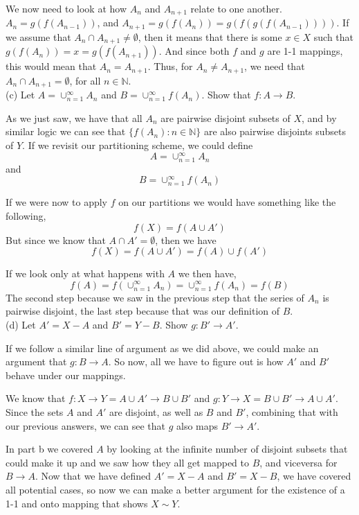 We now need to look at how $A_n$ and $A_{n+1}$ relate to one another.
$A_n = g(f(A_{n-1}))$, and $A_{n+1} = g(f(A_n)) = g(f(g(f(A_{n-1}))))$.
If we assume that $A_n \cap A_{n+1} \neq \emptyset$, then it means that there is
some $x\in X$ such that $g(f(A_n)) = x = g(f(A_{n+1}))$.
And since both $f$ and $g$ are 1-1 mappings, this would mean that $A_n = A_{n+1}$.
Thus, for $A_n \neq A_{n+1}$, we need that $A_n \cap A_{n+1} = \emptyset$, for all $n\in\mathbb{N}$.
\\



(c) Let $A =  \cup^{\infty}_{n=1} A_n$ and $B =  \cup^{\infty}_{n=1} f(A_n)$.
Show that $f: A \rightarrow B$.

As we just saw, we have that all $A_n$ are pairwise disjoint subsets of $X$, and by similar logic we can see that
$\{ f(A_n) : n\in\mathbb{N} \}$ are also pairwise disjoints subsets of $Y$.
If we revisit our partitioning scheme, we could define
$$
A = \cup^{\infty}_{n=1} A_n
$$
and
$$
B = \cup^{\infty}_{n=1} f(A_n)
$$

If we were now to apply $f$ on our partitions we would have something like the following,
$$
f(X) = f\left(
    A \cup A'
\right)
$$
But since we know that $A \cap A' = \emptyset$, then we have
$$
f(X) = f\left(   A \cup A' \right) =
    f(A) \cup f(A')
$$

If we look only at what happens with $A$ we then have,
$$
f(A) = f\left( \cup^{\infty}_{n=1} A_n \right) =
    \cup^{\infty}_{n=1} f(A_n) =
    f(B)
$$
The second step because we saw in the previous step that the series of $A_n$ is pairwise disjoint, the last step because
that was our definition of $B$.
\\

(d) Let $A' = X-A$ and $B' = Y-B$. Show $g: B' \rightarrow A'$.

If we follow a similar line of argument as we did above, we could make an argument that
$g: B\rightarrow A$.
So now, all we have to figure out is how $A'$ and $B'$ behave under our mappings.

We know that $f: X\rightarrow Y = A\cup A' \rightarrow B\cup B'$
and $g: Y \rightarrow X = B\cup B' \rightarrow A\cup A'$.
Since the sets $A$ and $A'$ are disjoint, as well as $B$ and $B'$, combining that with our previous answers,
we can see that $g$ also maps $B' \rightarrow A'$.

In part b we covered $A$ by looking at the infinite number of disjoint subsets that could make it up and we saw how
they all get mapped to $B$, and viceversa for $B \rightarrow A$.
Now that we have defined $A' = X-A$ and $B' = X-B$, we have covered all potential cases, so now we can
make a better argument for the existence of a 1-1 and onto mapping that shows $X \sim Y$.
\\~\\





